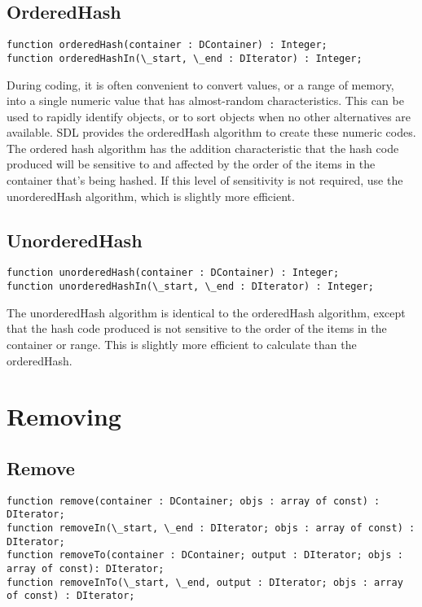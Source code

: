 \documentclass{report}
\begin{document}
\subsection{OrderedHash}

\begin{lstlisting}
function orderedHash(container : DContainer) : Integer;
function orderedHashIn(\_start, \_end : DIterator) : Integer;
\end{lstlisting}

During coding, it is often convenient to convert values, or a range of
memory, into a single numeric value that has almost-random characteristics. 
This can be used to rapidly identify objects, or to sort objects when no
other alternatives are available.  SDL provides the orderedHash algorithm to
create these numeric codes. The ordered hash algorithm has the addition
characteristic that the hash code produced will be sensitive to and affected
by the order of the items in the container that's being hashed. If this
level of sensitivity is not required, use the unorderedHash algorithm, which
is slightly more efficient.

\subsection{UnorderedHash}

\begin{lstlisting}
function unorderedHash(container : DContainer) : Integer;
function unorderedHashIn(\_start, \_end : DIterator) : Integer;
\end{lstlisting}

The unorderedHash algorithm is identical to the orderedHash algorithm,
except that the hash code produced is not sensitive to the order of the
items in the container or range. This is slightly more efficient to
calculate than the orderedHash.

\section{Removing}

\subsection{Remove}

\begin{lstlisting}
function remove(container : DContainer; objs : array of const) : DIterator;
function removeIn(\_start, \_end : DIterator; objs : array of const) : DIterator;
function removeTo(container : DContainer; output : DIterator; objs : array of const): DIterator;
function removeInTo(\_start, \_end, output : DIterator; objs : array of const) : DIterator;
\end{lstlisting}
\end{document}
